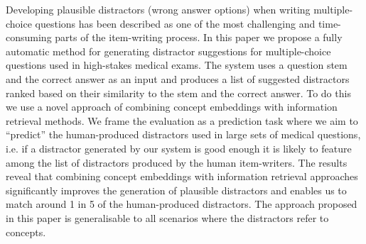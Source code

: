 Developing plausible distractors (wrong answer options) when writing multiple-choice questions has been described as one of the most challenging and time-consuming parts of the item-writing process. In this paper we propose a fully automatic method for generating distractor suggestions for multiple-choice questions used in high-stakes medical exams. The system uses a question stem and the correct answer as an input and produces a list of suggested distractors ranked based on their similarity to the stem and the correct answer. To do this we use a novel approach of combining concept embeddings with information retrieval methods. We frame the evaluation as a prediction task where we aim to ``predict'' the human-produced distractors used in large sets of medical questions, i.e. if a distractor generated by our system is good enough it is likely to feature among the list of distractors produced by the human item-writers. The results reveal that combining concept embeddings with information retrieval approaches significantly improves the generation of plausible distractors and enables us to match around 1 in 5 of the human-produced distractors. The approach proposed in this paper is generalisable to all scenarios where the distractors refer to concepts.
